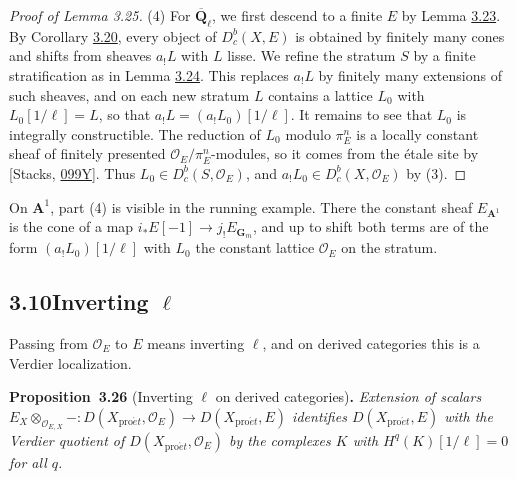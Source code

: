\documentclass[11pt]{article}
\newenvironment{bpstatement}[2]{\par\addvspace{0.6\baselineskip}\noindent\textbf{#1}#2\textbf{.}\enspace\ignorespaces}
  {\par\addvspace{0.4\baselineskip}}
\newenvironment{bpstatementit}[2]{\begin{bpstatement}{#1}{#2}\itshape\ignorespaces}{\end{bpstatement}}
\providecommand{\Dbc}{}\renewcommand{\Dbc}{D^b_c}
\begin{document}
\begin{proof}[{Proof of Lemma 3.25}]
(4) For \(\overline{\mathbf Q}_\ell\), we first descend to a finite \(E\) by Lemma \hyperref[bp73]{3.23}. By Corollary \hyperref[bp61]{3.20}, every object of \(\Dbc(X,E)\) is obtained by finitely many cones and shifts from sheaves \(a_!L\) with \(L\) lisse. We refine the stratum \(S\) by a finite stratification as in Lemma \hyperref[bp77]{3.24}. This replaces \(a_!L\) by finitely many extensions of such sheaves, and on each new stratum \(L\) contains a lattice \(L_0\) with \(L_0[1/\ell]=L\), so that \(a_!L=(a_!L_0)[1/\ell]\). It remains to see that \(L_0\) is integrally constructible. The reduction of \(L_0\) modulo \(\pi_E^n\) is a locally constant sheaf of finitely presented \(\mathcal O_E/\pi_E^n\)-modules, so it comes from the étale site by [Stacks, \href{https://stacks.math.columbia.edu/tag/099Y}{099Y}]. Thus \(L_0\in\Dbc(S,\mathcal O_E)\), and \(a_!L_0\in\Dbc(X,\mathcal O_E)\) by (3).
\end{proof}

\label{bp85}%
On \(\mathbf A^1\), part (4) is visible in the running example. There the constant sheaf \(E_{\mathbf A^1}\) is the cone of a map \(i_*E[-1]\to j_!E_{\mathbf G_m}\), and up to shift both terms are of the form \((a_!L_0)[1/\ell]\) with \(L_0\) the constant lattice \(\mathcal O_E\) on the stratum.


\subsection*{\texorpdfstring{3.10\quad Inverting $\ell$}{3.10 Inverting ell}}
\label{bp86}%
\label{bp87}%
Passing from \(\mathcal O_E\) to \(E\) means inverting \(\ell\), and on derived categories this is a Verdier localization.

\label{bp88}%
\begin{bpstatementit}{Proposition~3.26}{ (Inverting $\ell$ on derived categories)}
Extension of scalars \(E_X\otimes_{\mathcal O_{E,X}}-:
D(X_{\mathrm{pro}\acute{e}t},\mathcal O_E)\to D(X_{\mathrm{pro}\acute{e}t},E)\) identifies \(D(X_{\mathrm{pro}\acute{e}t},E)\) with the Verdier quotient of \(D(X_{\mathrm{pro}\acute{e}t},\mathcal O_E)\) by the complexes \(K\) with \(H^q(K)[1/\ell]=0\) for all \(q\).
\end{bpstatementit}
\end{document}
